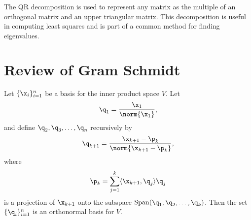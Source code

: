 \label{lab:QRdecomp}


The QR decomposition is used to represent any matrix as the multiple of an orthogonal matrix and an upper triangular matrix. This decomposition is useful in computing least squares and is part of a common method for finding eigenvalues.

\section*{Review of Gram Schmidt}

\vspace{5mm}
\begin{theorem} Let
$\{\x_i\}_{i=1}^n$ be a basis for the inner product space $V$. Let
\[
\q_1 = \frac{\x_1}{\norm{\x_1}},
\]
and define $\q_2,\q_3,\ldots,\q_n$ recursively by
\[
\q_{k+1} = \frac{\x_{k+1} - \p_k}{\norm{\x_{k+1} - \p_k}},
\]
where
\[
\p_k = \sum^k_{j=1} \langle \x_{k+1}, \q_j\rangle \q_j
\]
is a projection of $\x_{k+1}$ onto the subspace $\mbox{Span}(\q_1,\q_2,\ldots,\q_k)$.  Then the set $\{\q_i\}_{i=1}^n$ is an orthonormal basis for $V$.
\end{theorem}
\vspace{5mm}

